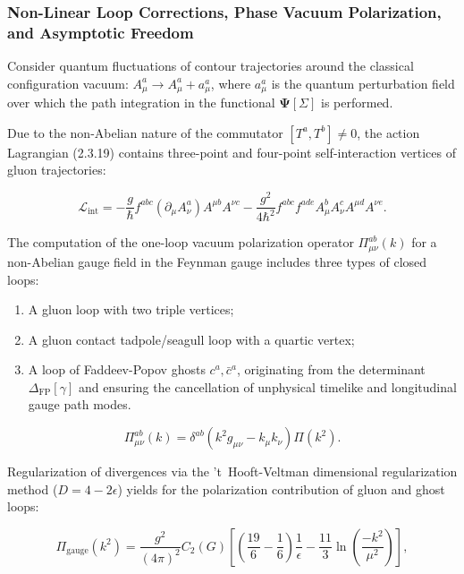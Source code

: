 \subsubsection{Non-Linear Loop Corrections, Phase Vacuum Polarization, and Asymptotic Freedom}\label{sec:2.3.4}

Consider quantum fluctuations of contour trajectories around the classical configuration vacuum: $A_\mu^a \to A_\mu^a + a_\mu^a$, where $a_\mu^a$ is the quantum perturbation field over which the path integration in the functional $\mathbf{\Psi}[\Sigma]$ is performed.

Due to the non-Abelian nature of the commutator $[T^a, T^b] \neq 0$, the action Lagrangian (2.3.19) contains three-point and four-point self-interaction vertices of gluon trajectories:

\begin{equation}\label{eq:2.3.21}\tag{2.3.21}
\mathcal{L}_{\text{int}} = - \frac{g}{\hbar} f^{abc} (\partial_\mu A_\nu^a) A^{\mu b} A^{\nu c} - \frac{g^2}{4\hbar^2} f^{abc} f^{ade} A_\mu^b A_\nu^c A^{\mu d} A^{\nu e}.
\end{equation}

The computation of the one-loop vacuum polarization operator $\Pi_{\mu\nu}^{ab}(k)$ for a non-Abelian gauge field in the Feynman gauge includes three types of closed loops:
\begin{enumerate}
\item A gluon loop with two triple vertices;
\item A gluon contact tadpole/seagull loop with a quartic vertex;
\item A loop of Faddeev-Popov ghosts $c^a, \bar{c}^a$, originating from the determinant $\Delta_{\text{FP}}[\gamma]$ and ensuring the cancellation of unphysical timelike and longitudinal gauge path modes.
\end{enumerate}

\begin{equation}\label{eq:2.3.22}\tag{2.3.22}
\Pi_{\mu\nu}^{ab}(k) = \delta^{ab} \left( k^2 g_{\mu\nu} - k_\mu k_\nu \right) \Pi(k^2).
\end{equation}

Regularization of divergences via the 't~Hooft-Veltman dimensional regularization method ($D = 4 - 2\epsilon$) yields for the polarization contribution of gluon and ghost loops:

\begin{equation}\label{eq:2.3.23}\tag{2.3.23}
\Pi_{\text{gauge}}(k^2) = \frac{g^2}{(4\pi)^2} C_2(G) \left[ \left( \frac{19}{6} - \frac{1}{6} \right) \frac{1}{\epsilon} - \frac{11}{3} \ln\left( \frac{-k^2}{\mu^2} \right) \right],
\end{equation}

